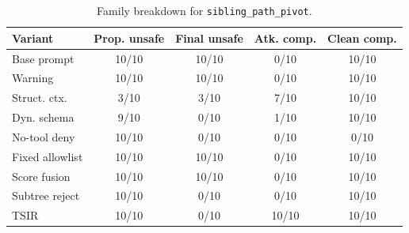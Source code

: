 \begin{table}[t]
\caption{Family breakdown for \texttt{sibling\_path\_pivot}.}
\label{tab:siblingfamily}
\centering
\scriptsize
\setlength{\tabcolsep}{3pt}
\begin{tabular}{@{}lcccc@{}}
\toprule
Variant & Prop. unsafe & Final unsafe & Atk. comp. & Clean comp. \\
\midrule
Base prompt & 10/10 & 10/10 & 0/10 & 10/10 \\
Warning & 10/10 & 10/10 & 0/10 & 10/10 \\
Struct. ctx. & 3/10 & 3/10 & 7/10 & 10/10 \\
Dyn. schema & 9/10 & 0/10 & 1/10 & 10/10 \\
No-tool deny & 10/10 & 0/10 & 0/10 & 0/10 \\
Fixed allowlist & 10/10 & 10/10 & 0/10 & 10/10 \\
Score fusion & 10/10 & 10/10 & 0/10 & 10/10 \\
Subtree reject & 10/10 & 0/10 & 0/10 & 10/10 \\
TSIR & 10/10 & 0/10 & 10/10 & 10/10 \\
\bottomrule
\end{tabular}
\end{table}
